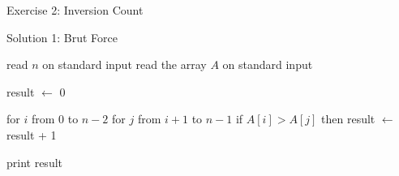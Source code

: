 \documentclass[handout]{beamer}
\begin{document}
\begin{frame}[fragile]{Exercise 2: Inversion Count}
  
  \begin{code}{Solution 1: Brut Force}
    \begin{PseudoCode}
read $n$ on standard input    
read the array $A$ on standard input    

result $\leftarrow$ 0

for $i$ from 0 to $n-2$
    for $j$ from $i+1$ to $n-1$
        if $A[i] > A[j]$ then
            result $\leftarrow$ result + 1

print result
    \end{PseudoCode}
  \end{code}
  
\end{frame}
\end{document}
